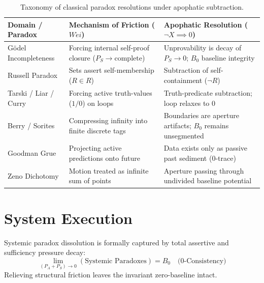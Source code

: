 \documentclass[master_monograph.tex]{subfiles}
\begin{document}
\begin{table}[ht!]
\centering
\small
\renewcommand{\arraystretch}{1.3}
\begin{tabularx}{\textwidth}{@{} Y Y Y @{}}
\toprule
\textbf{Domain / Paradox} & \textbf{Mechanism of Friction ($W\acute{e}i$)} & \textbf{Apophatic Resolution ($\neg X \implies 0$)} \\
\midrule
Gödel Incompleteness & Forcing internal self-proof closure ($P_S \to \text{complete}$) & Unprovability is decay of $P_S \to 0$; $B_0$ baseline integrity \\
Russell Paradox & Sets assert self-membership ($R \in R$) & Subtraction of self-containment ($\neg R$) \\
Tarski / Liar / Curry & Forcing active truth-values ($1/0$) on loops & Truth-predicate subtraction; loop relaxes to $0$ \\
Berry / Sorites & Compressing infinity into finite discrete tags & Boundaries are aperture artifacts; $B_0$ remains unsegmented \\
Goodman Grue & Projecting active predictions onto future & Data exists only as passive past sediment ($0$-trace) \\
Zeno Dichotomy & Motion treated as infinite sum of points & Aperture passing through undivided baseline potential \\
\bottomrule
\end{tabularx}
\caption{Taxonomy of classical paradox resolutions under apophatic subtraction.}
\label{tab:paradox_matrix}
\end{table}

\section{System Execution}
Systemic paradox dissolution is formally captured by total assertive and sufficiency pressure decay:
\begin{equation}
\lim_{(P_A + P_S) \to 0} (\text{Systemic Paradoxes}) = B_0 \quad \text{(0-Consistency)}
\end{equation}
Relieving structural friction leaves the invariant zero-baseline intact.
\end{document}
